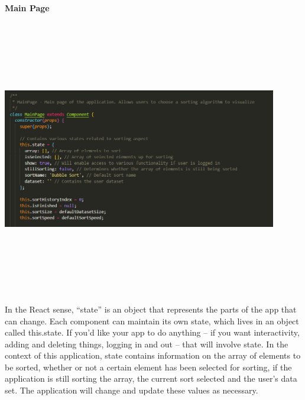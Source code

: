 \paragraph{Main Page}
\begin{center}
    \includegraphics[width=12cm,height=12cm,keepaspectratio]{images/mainpage1}
\end{center}
In the React sense, “state” is an object that represents the parts of the app that can change. Each component can maintain its own state, which lives in an object called this.state. If you’d like your app to do anything – if you want interactivity, adding and deleting things, logging in and out – that will involve state. In the context of this application, state contains information on the array of elements to be sorted, whether or not a certain element has been selected for sorting, if the application is still sorting the array, the current sort selected and the user's data set. The application will change and update these values as necessary.
\newpage
